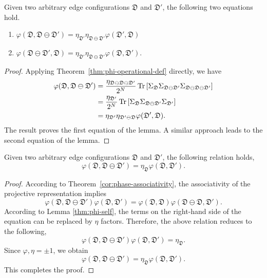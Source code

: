 \begin{lemma}\label{g-reduce-theorem.thm}
Given two arbitrary edge configurations $\mathfrak{D}$ and $\mathfrak{D}'$, the following two equations hold.
\begin{enumerate}
    \item [(i)] $\varphi(\mathfrak{D},\mathfrak{D}\ominus\mathfrak{D}') = \eta_{\mathfrak{D}'}\eta_{\mathfrak{D}\ominus\mathfrak{D}'} \varphi(\mathfrak{D}',\mathfrak{D})$
    \item [(ii)] $\varphi(\mathfrak{D}\ominus\mathfrak{D}',\mathfrak{D}) = \eta_{\mathfrak{D}'}\eta_{\mathfrak{D}\ominus\mathfrak{D}'} \varphi(\mathfrak{D},\mathfrak{D}')$.
\end{enumerate}
\end{lemma}
\begin{proof}
Applying Theorem~\ref{thm:phi-operational-def} directly, we have
  \begin{align*}
    \varphi(\mathfrak{D},\mathfrak{D}\ominus\mathfrak{D}') &= \frac{\eta_{\mathfrak{D}\ominus\mathfrak{D}\ominus\mathfrak{D}'}}{2^{N}}\Tr\left[ \Sigma_{\mathfrak{D}}\Sigma_{\mathfrak{D}\ominus\mathfrak{D}'}\Sigma_{\mathfrak{D}\ominus\mathfrak{D}\ominus\mathfrak{D}'} \right] \\
    &= \frac{\eta_{\mathfrak{D}'}}{2^{N}}\Tr\left[ \Sigma_{\mathfrak{D}}\Sigma_{\mathfrak{D}\ominus\mathfrak{D}'}\Sigma_{\mathfrak{D}'} \right] \\
    &=\eta_{\mathfrak{D}'}\eta_{\mathfrak{D}'\ominus\mathfrak{D}} \varphi(\mathfrak{D}',\mathfrak{D}).
  \end{align*}
The result proves the first equation of the lemma. A similar approach leads to the second equation of the lemma.
\end{proof}
\begin{lemma}\label{g_reduce_symmetric.e}
Given two arbitrary edge configurations $\mathfrak{D}$ and $\mathfrak{D}'$, the following relation holds,
  \[
  \varphi(\mathfrak{D}, \mathfrak{D}\ominus\mathfrak{D}') = \eta_{\mathfrak{D}}\varphi(\mathfrak{D},\mathfrak{D}').
  \]
\end{lemma}
\begin{proof}
  According to Theorem~\ref{cor:phase-associativity}, the associativity of the projective representation implies
  \[
  \varphi(\mathfrak{D},\mathfrak{D}\ominus\mathfrak{D}')\varphi(\mathfrak{D},\mathfrak{D}') = \varphi(\mathfrak{D},\mathfrak{D})\varphi(\mathfrak{D}\ominus\mathfrak{D},\mathfrak{D}').
  \]
  According to Lemma \ref{thm:phi-self}, the terms on the right-hand side of the equation can be replaced by $\eta$ factors. Therefore, the above relation reduces to the following,
  \[
  \varphi(\mathfrak{D},\mathfrak{D}\ominus\mathfrak{D}')\varphi(\mathfrak{D},\mathfrak{D}') = \eta_{\mathfrak{D}}.
  \]
  Since $\varphi,\eta = \pm 1$, we obtain
  \[
  \varphi(\mathfrak{D},\mathfrak{D}\ominus\mathfrak{D}') = \eta_{\mathfrak{D}}\varphi(\mathfrak{D},\mathfrak{D}').
  \]
  This completes the proof.
\end{proof}
